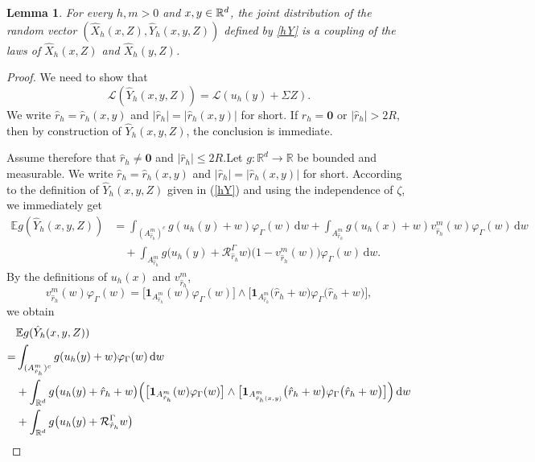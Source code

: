 \documentclass[aap]{imsart}
\theoremstyle{plain}
\newtheorem{lemma}[theorem]{Lemma}
\theoremstyle{definition}
\begin{document}
\begin{lemma}\label{coup}
For every \(h, m>0\) and \(x,y\in\mathbb{R}^d\), the joint distribution of the random vector \((\hat X_h(x,Z),\hat Y_h(x,y,Z))\) defined by \eqref{hY} is a coupling of the laws of \(\hat X_h(x,Z)\) and \(\hat X_h(y,Z)\).
\end{lemma}
\begin{proof}
We need to show that
\[\mathcal L(\hat Y_h(x,y,Z))=\mathcal L(u_h(y)+\Sigma Z).\]
We write $\hat{r}_h = \hat{r}_h(x, y)$ and $|\hat{r}_h| = |\hat{r}_h(x, y)|$ for short. If \(\hat r_h=\mathbf 0\) or \(|\hat r_h|>2R\), then by construction of \(\hat Y_h(x,y,Z)\), the conclusion is immediate.

Assume therefore that \(\hat r_h\neq\mathbf 0\) and \(|\hat r_h|\leqslant 2R\).Let \(g:\mathbb R^d\to\mathbb R\) be bounded and measurable. We write $\hat{r}_h = \hat{r}_h(x, y)$ and $|\hat{r}_h| = |\hat{r}_h(x, y)|$ for short.
According to the definition of $\hat{Y}_h(x, y, Z)$ given in (\ref{hY}) and using the independence of \(\zeta\), we immediately get 
	\[
	\begin{aligned}
		\mathbb E g(\hat Y_h(x,y,Z))
		&=
		\int_{(A_{\hat r_h}^m)^c}
		g(u_h(y)+w)\varphi_\Gamma(w)\,\mathrm dw +
		\int_{A_{\hat r_h}^m}
		g(u_h(x)+w)
		v_{\hat r_h}^m(w)
		\varphi_\Gamma(w)\,\mathrm dw                 \\
		&\quad+
		\int_{A_{\hat r_h}^m}
		g\bigl(
		u_h(y)+\mathcal R_{\hat r_h}^\Gamma w
		\bigr)
		\bigl(1-v_{\hat r_h}^m(w)\bigr)
		\varphi_\Gamma(w)\,\mathrm dw .
	\end{aligned}
	\]
	By the definitions of \(u_h(x)\) and \(v_{\hat r_h}^m\),
	\[v_{\hat r_h}^m(w)\varphi_\Gamma(w)=
		\bigl[
		\mathbf 1_{A_{\hat r_h}^m}(w)
		\varphi_\Gamma(w)
		\bigr] \wedge
		\bigl[
		\mathbf 1_{A_{\hat r_h}^m}
		\bigl(\hat r_h+w\bigr)
		\varphi_\Gamma\bigl(\hat r_h+w\bigr)
		\bigr],\]
	we obtain
	\[
	\begin{aligned}
		&\mathbb E g(\hat Y_h(x,y,Z))
		\\
		=&\int_{(A_{\hat r_h}^m)^c}
		g(u_h(y)+w)\varphi_\Gamma(w)\,\mathrm dw \\
		&+\int_{\mathbb R^d}
		g\bigl(u_h(y)+\hat r_h+w\bigr)
		\Bigl(\bigl[
		\mathbf 1_{A_{\hat r_h}^m}(w)
		\varphi_\Gamma(w)
		\bigr] \wedge
		\bigl[
		\mathbf 1_{A_{\hat r_h(x,y)}^m}
		\bigl(\hat r_h+w\bigr)
		\varphi_\Gamma\bigl(\hat r_h+w\bigr)
		\bigr]
		\Bigr)\,\mathrm dw                                         \\
		&+
		\int_{\mathbb R^d}
		g\bigl(u_h(y)+\mathcal R_{\hat r_h}^\Gamma w\bigr)

\end{aligned}\]
\end{proof}
\end{document}
